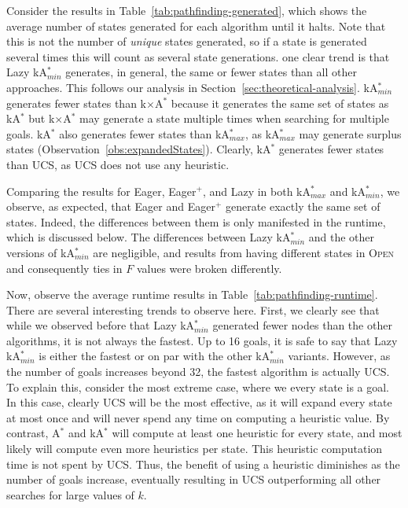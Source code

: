 \documentclass{aicom2e}
\newcommand{\astar}{A$^*$}
\newcommand{\kastar}{kA$^*$}
\newcommand{\kastarmin}{kA$^*_{min}$}
\newcommand{\kastarmax}{kA$^*_{max}$}
\newcommand{\kxastar}{k$\times$A$^*$}
\newcommand{\open}{\textsc{Open}}
\begin{document}
Consider the results in Table~\ref{tab:pathfinding-generated}, 
which shows the average number of states generated for each algorithm until it halts. Note that this is not the number of {\em unique} states generated, so if a state is generated several times this will count as several state generations.
one clear trend is that Lazy \kastarmin{} generates, in general, the same or fewer states than all other approaches. 
This follows our analysis in Section~\ref{sec:theoretical-analysis}. \kastarmin{} generates fewer states than \kxastar{} because it generates the same set of states as \kastar{} but \kxastar{} may generate a state multiple times when searching for multiple goals. \kastar{} also generates fewer states than \kastarmax{}, as \kastarmax{} may generate surplus states (Observation~\ref{obs:expandedStates}). Clearly, \kastar{} generates fewer states than UCS, as UCS does not use any heuristic. 

Comparing the results for Eager, Eager$^+$, and Lazy in both \kastarmax{} and \kastarmin{}, we observe, as expected, that Eager and Eager$^+$ generate exactly the same set of states. Indeed, the differences between them is only manifested in the runtime, which is discussed below. The differences between Lazy \kastarmin{} and the other versions of \kastarmin{} are negligible, and results from having different states in \open{} and consequently ties in $F$ values were broken differently. 


Now, observe the average runtime results in Table~\ref{tab:pathfinding-runtime}.
There are several interesting trends to observe here. First, we clearly see that while we observed before that Lazy \kastarmin{} generated fewer nodes than the other algorithms, it is not always the fastest. Up to 16 goals, it is safe to say that Lazy \kastarmin{} is either the fastest or on par with the other \kastarmin{} variants. However, as the number of goals increases beyond 32, the fastest algorithm is actually UCS. To explain this, consider the most extreme case, where we every state is a goal. In this case, clearly UCS will be the most effective, as it will expand every state at most once and will never spend any time on computing a heuristic value. By contrast, \astar{} and \kastar{} will compute at least one heuristic for every state, and most likely will compute even more heuristics per state. This heuristic computation time is not spent by UCS. Thus, the benefit of using a heuristic diminishes as the number of goals increase, eventually resulting in UCS outperforming all other searches for large values of $k$. %
\end{document}
